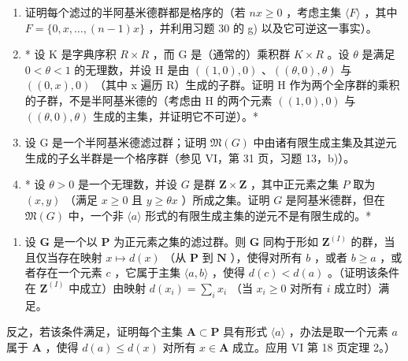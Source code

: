 \begin{enumerate}
\def\labelenumi{\alph{enumi})}
\item
  证明每个滤过的半阿基米德群都是格序的（若 \(nx \geqslant 0\) ，考虑主集 \(\langle F \rangle\) ，其中 \(F = \{0, x, \ldots, (n - 1)x\}\) ，并利用习题 30 的 g) 以及它可逆这一事实）。
\item
  * 设 K 是字典序积 \(R \times R\) ，而 G 是（通常的）乘积群 \(K \times R\) 。设 \(\theta\) 是满足 \(0 < \theta < 1\) 的无理数，并设 H 是由 \(((1, 0), 0)\) 、\(((\theta, 0), \theta)\) 与 \(((0, x), 0)\) （其中 x 遍历 R）生成的子群。证明 H 作为两个全序群的乘积的子群，不是半阿基米德的（考虑由 H 的两个元素 \(((1,0),0)\) 与 \(((\theta ,0),\theta)\) 生成的主集，并证明它不可逆）。*
\item
  设 G 是一个半阿基米德滤过群；证明 \(\mathfrak{M}(G)\) 中由诸有限生成主集及其逆元生成的子幺半群是一个格序群（参见 VI，第 31 页，习题 13，b)）。
\item
  * 设 \(\theta > 0\) 是一个无理数，并设 \(G\) 是群 \(\mathbf{Z} \times \mathbf{Z}\) ，其中正元素之集 \(P\) 取为 \((x, y)\) （满足 \(x \geqslant 0\) 且 \(y \geqslant \theta x\) ）所成之集。证明 \(G\) 是阿基米德群，但在 \(\mathfrak{M}(G)\) 中，一个非 \(\langle a \rangle\) 形式的有限生成主集的逆元不是有限生成的。*
\end{enumerate}

\begin{enumerate}
\def\labelenumi{\arabic{enumi})}
\setcounter{enumi}{35}
\tightlist
\item
  设 \(\mathbf{G}\) 是一个以 \(\mathbf{P}\) 为正元素之集的滤过群。则 \(\mathbf{G}\) 同构于形如 \(\mathbf{Z}^{(I)}\) 的群，当且仅当存在映射 \(x \mapsto d(x)\) （从 \(\mathbf{P}\) 到 \(\mathbf{N}\) ），使得对所有 \(b\) ，或者 \(b \geqslant a\) ，或者存在一个元素 \(c\) ，它属于主集 \(\langle a, b \rangle\) ，使得 \(d(c) < d(a)\) 。（证明该条件在 \(\mathbf{Z}^{(I)}\) 中成立）由映射 \(d(x_{i}) = \sum_{i} x_{i}\) （当 \(x_{i} \geqslant 0\) 对所有 \(i\) 成立时）满足。
\end{enumerate}

反之，若该条件满足，证明每个主集 \(\mathbf{A} \subset \mathbf{P}\) 具有形式 \(\langle a \rangle\) ，办法是取一个元素 \(a\) 属于 \(\mathbf{A}\) ，使得 \(d(a) \leqslant d(x)\) 对所有 \(x \in \mathbf{A}\) 成立。应用 VI 第 18 页定理 2。）
